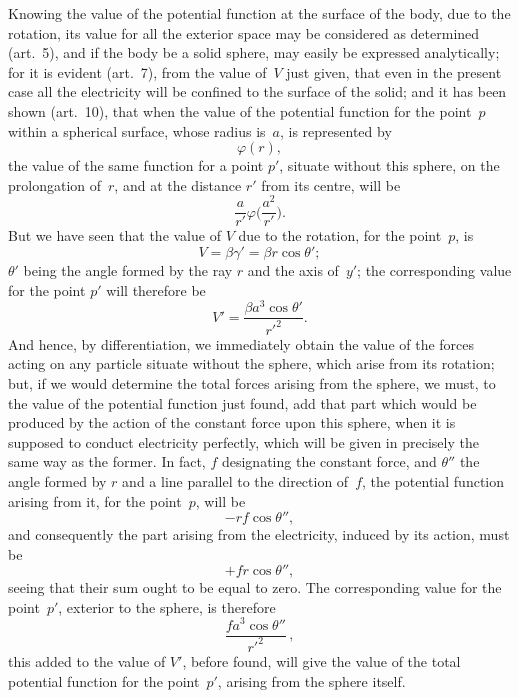 \documentclass[11pt,notitlepage]{amsart}
\renewcommand{\phi}{\varphi}
\begin{document}
Knowing the value of the potential function at the surface of the body,
due to the rotation, its value for all the exterior space may be considered as
determined (art.~5), and if the body be a solid sphere, may easily be expressed
analytically; for it is evident (art.~7), from the value of~$V$ just given, that
even in the present case all the electricity will be confined to the surface of
the solid; and it has been shown (art.~10), that when the value of the 
potential function for the point~$p$
within a spherical surface, whose radius is~$a$,
is represented by
\[
\phi(r),
\]
the value of the same function for a point $p'$, situate without this sphere, on
the prolongation of~$r$, and at the distance $r'$ from its centre, will be
\[
\frac{a}{r'}\phi\biggl(\frac{a^2}{r'}\biggr).
\]
But we have seen that the value of $V$ due to the rotation,
for the point~$p$, is
\[
V=\beta\gamma'=\beta r\cos\theta';
\]
$\theta'$ being the angle formed by the ray $r$ and the axis of~$y'$;
the corresponding
value for the point $p'$ will therefore be
\[
V'=\frac{\beta a^3\cos\theta'}{r'^2}.
\]
And hence, by differentiation, we immediately obtain the value of the forces
acting on any particle situate without the sphere,
which arise from its rotation;
but, if we would determine the total forces arising from the sphere, we must,
to the value of the potential function just found, add that part which would
be produced by the action of the constant force upon this sphere, when it is
supposed to conduct electricity perfectly, which will be given in precisely the
same way as the former. In fact, $f$ designating the constant force,
and $\theta''$
the angle formed by $r$ and a line parallel to the direction of~$f$,
the potential
function arising from it, for the point~$p$, will be
\[
-rf\cos\theta'',
\]
and consequently the part arising from the electricity, induced by its action,
must be
\[
+fr\cos\theta'',
\]
seeing that their sum ought to be equal to zero. The corresponding value
for the point~$p'$, exterior to the sphere, is therefore
\[
\frac{fa^3\cos\theta''}{r'^2}\,,
\]
this added to the value of $V'$, before found, will give the value of the total
potential function for the point~$p'$, arising from the sphere itself.
\end{document}
